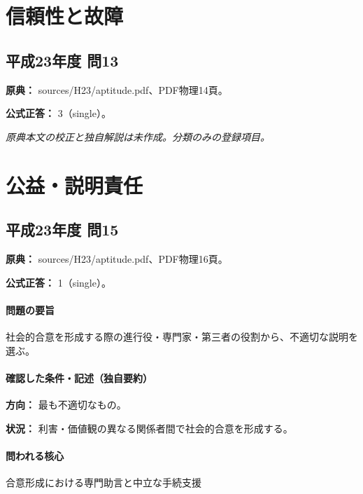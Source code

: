 \section{信頼性と故障}

\subsection{平成23年度 問13}
\label{q:h23-reg-apt-13}

\noindent\textbf{原典：} sources/H23/aptitude.pdf、PDF物理14頁。

\textbf{公式正答：} 3（single）。

\par\textit{原典本文の校正と独自解説は未作成。分類のみの登録項目。}

\section{公益・説明責任}

\subsection{平成23年度 問15}
\label{q:h23-reg-apt-15}

\noindent\textbf{原典：} sources/H23/aptitude.pdf、PDF物理16頁。

\textbf{公式正答：} 1（single）。

\paragraph{問題の要旨} 社会的合意を形成する際の進行役・専門家・第三者の役割から、不適切な説明を選ぶ。

\paragraph{確認した条件・記述（独自要約）}\mbox{}\par

\noindent\textbf{方向：} 最も不適切なもの。\par

\noindent\textbf{状況：} 利害・価値観の異なる関係者間で社会的合意を形成する。\par

\paragraph{問われる核心} 合意形成における専門助言と中立な手続支援

